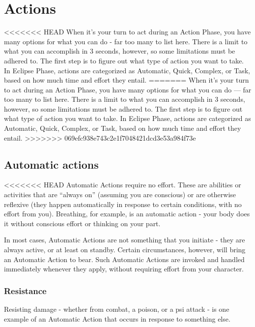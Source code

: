 \section{Actions} \label{sec:actions} 

<<<<<<< HEAD When it’s your turn to act during an Action Phase, you have many options for what you can do - far too many to list here. There is a limit to what you can accomplish in 3 seconds, however, so some limitations must be adhered to. The first step is to figure out what type of action you want to take. In Eclipse Phase, actions are categorized as Automatic, Quick, Complex, or Task, based on how much time and effort they entail. ======= When it’s your turn to act during an Action Phase, you have many options for what you can do --- far too many to list here. There is a limit to what you can accomplish in 3 seconds, however, so some limitations must be adhered to. The first step is to figure out what type of action you want to take. In Eclipse Phase, actions are categorized as Automatic, Quick, Complex, or Task, based on how much time and effort they entail. >>>>>>> 069efc938e743c2e1f7048421dcd3e53a984f73e 



\subsection{Automatic actions} \label{sec:combat-automatic-actions} 

<<<<<<< HEAD Automatic Actions require no effort. These are abilities or activities that are ``always on'' (assuming you are conscious) or are otherwise reflexive (they happen automatically in response to certain conditions, with no effort from you). Breathing, for example, is an automatic action - your body does it without conscious effort or thinking on your part. 

In most cases, Automatic Actions are not something that you initiate - they are always active, or at least on standby. Certain circumstances, however, will bring an Automatic Action to bear. Such Automatic Actions are invoked and handled immediately whenever they apply, without requiring effort from your character. 

\subsubsection{Resistance} 

Resisting damage - whether from combat, a poison, or a psi attack - is one example of an Automatic Action that occurs in response to something else. 

